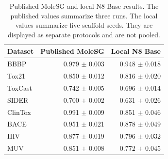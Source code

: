 \begin{table}[t]
\centering
\caption{Published MoleSG and local N8 Base results. The published values summarize three runs. The local values summarize five scaffold seeds. They are displayed as separate protocols and are not pooled.}
\label{tab:molesg-comparison}
\begin{tabular}{lrr}
\toprule
Dataset & Published MoleSG & Local N8 Base \\
\midrule
BBBP & 0.979 $\pm$ 0.003 & 0.948 $\pm$ 0.018 \\
Tox21 & 0.850 $\pm$ 0.012 & 0.816 $\pm$ 0.020 \\
ToxCast & 0.742 $\pm$ 0.005 & 0.696 $\pm$ 0.014 \\
SIDER & 0.700 $\pm$ 0.002 & 0.631 $\pm$ 0.026 \\
ClinTox & 0.991 $\pm$ 0.009 & 0.851 $\pm$ 0.046 \\
BACE & 0.951 $\pm$ 0.021 & 0.878 $\pm$ 0.049 \\
HIV & 0.877 $\pm$ 0.019 & 0.796 $\pm$ 0.032 \\
MUV & 0.851 $\pm$ 0.008 & 0.772 $\pm$ 0.045 \\
\bottomrule
\end{tabular}
\end{table}
